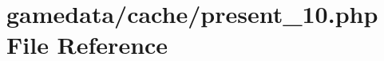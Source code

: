 \hypertarget{present__10_8php}{\section{gamedata/cache/present\+\_\+10.php File Reference}
\label{present__10_8php}
}
